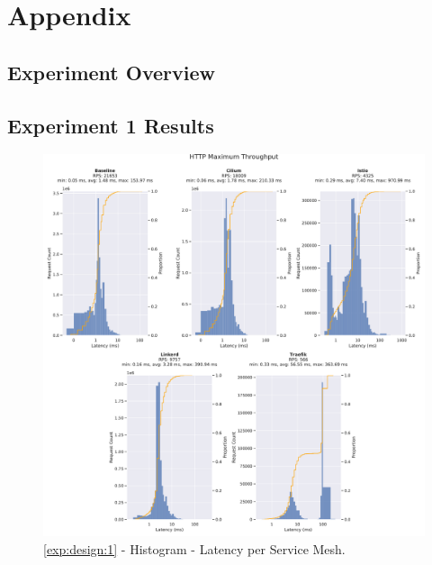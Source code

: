 \chapter*{Appendix}





\section{Experiment Overview}





\section{Experiment 1 Results}

\begin{figure}[h]
    \centering
    
    \includegraphics[width=\linewidth]{5_experimental_evaluation/figures/exp_01-latency-results.pdf}

    \caption{\ref{exp:design:1} - Histogram - Latency per Service Mesh.}
    
    \label{fig:appendix:exp:result:01:latency:histogram}
\end{figure}

